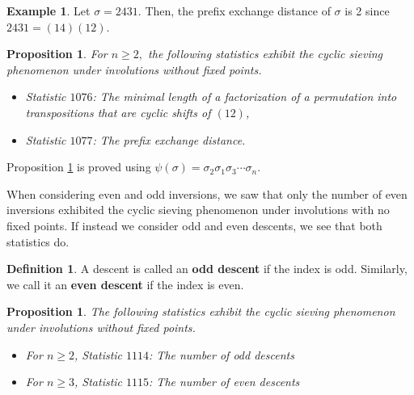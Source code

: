\documentclass{amsart}
\newtheorem{prop}[thm]{Proposition}
\theoremstyle{definition}
\newtheorem{definition}[thm]{Definition}
\newtheorem{example}[thm]{Example}
\begin{document}
\begin{example} Let $\sigma = 2431$. Then, the prefix exchange distance of $\sigma$ is 2 since $2431 = (14)(12)$.
\end{example}


\begin{prop}\label{transpositions} For $n \geq 2,$ the following statistics exhibit the cyclic sieving phenomenon under involutions without fixed points.
  \begin{itemize}
    \item Statistic $1076$: The minimal length of a factorization of a permutation into transpositions that are cyclic shifts of $(12)$,
    \item Statistic $1077$: The prefix exchange distance.
  \end{itemize}
\end{prop}

Proposition \ref{transpositions} is proved using $\psi(\sigma) = \sigma_2\sigma_1\sigma_3 \dotsm \sigma_n$.

When considering even and odd inversions, we saw that only the number of even inversions exhibited the cyclic sieving phenomenon under involutions with no fixed points. If instead we consider odd and even descents, we see that both statistics do.

\begin{definition}
  A descent is called an \textbf{odd descent} if the index is odd. Similarly, we call it an \textbf{even descent} if the index is even.
\end{definition}


\begin{prop}\label{odd_even_des}
  The following statistics exhibit the cyclic sieving phenomenon under involutions without fixed points.
  \begin{itemize}
    \item For $n \geq 2$, Statistic $1114$: The number of odd descents
    \item For $n \geq 3$, Statistic $1115$: The number of even descents
  \end{itemize}
\end{prop}
\end{document}

